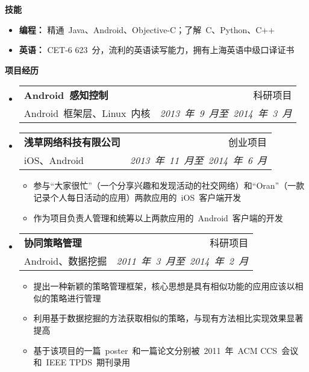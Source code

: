 \documentclass[letterpaper,10pt]{article}
\makeatletter
\newcommand{\resitem}[1]{\item #1 \vspace{-2pt}}
\newcommand{\resheading}[1]{{\large \colorbox{mygrey}{\begin{minipage}{\textwidth}{\textbf{#1 \vphantom{p\^{E}}}}\end{minipage}}}}
\newcommand{\ressubheading}[4]{
\begin{tabular*}{6.5in}{l@{\extracolsep{\fill}}r}
		\textbf{#1} & #2 \\
		#3 & #4 \\
\end{tabular*}\vspace{-6pt}}
\makeatother
\begin{document}
\resheading{{技能}}
	\begin{itemize}
		\item
            \textbf{编程：} 精通~Java、Android、Objective-C；了解~C、Python、C++
        \item
            \textbf{英语：} CET-6 623~分，流利的英语读写能力，拥有上海英语中级口译证书
	\end{itemize} %

\resheading{项目经历}
	\begin{itemize}
		\item
			\ressubheading{Android~感知控制}{科研项目}{Android~框架层、Linux~内核}{\emph{2013~年~9~月至~2014~年~3~月}}
			{
			}	
	\end{itemize}
			
	\begin{itemize}
		\item
			\ressubheading{浅草网络科技有限公司}{创业项目}{iOS、Android}{\emph{2013~年~11~月至~2014~年~6~月}}
			{\begin{itemize}
				\resitem{参与“大家很忙”（一个分享兴趣和发现活动的社交网络）和“Oran”（一款记录个人每日活动的应用）两款应用的~iOS~客户端开发}
                \resitem{作为项目负责人管理和统筹以上两款应用的~Android~客户端的开发}
			\end{itemize}
			}	
	\end{itemize}
	\begin{itemize}
		\item
			\ressubheading{协同策略管理}{科研项目}{Android、数据挖掘}{\emph{2011~年~3~月至~2014~年~2~月}}
			{\begin{itemize}
				\resitem{提出一种新颖的策略管理框架，核心思想是具有相似功能的应用应该以相似的策略进行管理}
				\resitem{利用基于数据挖掘的方法获取相似的策略，与现有方法相比实现效果显著提高}
				\resitem{基于该项目的一篇~poster~和一篇论文分别被~2011~年~ACM CCS~会议和~IEEE TPDS~期刊录用}
			\end{itemize}
			}	
	\end{itemize}  %
\end{document}
